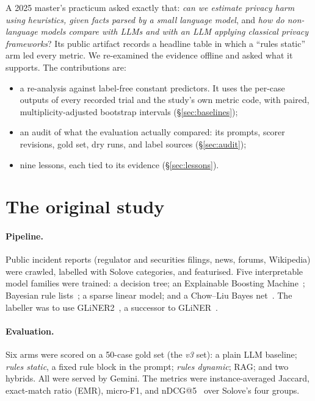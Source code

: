\documentclass[10pt,twocolumn]{article}
\begin{document}
A 2025 master's practicum asked exactly that: \emph{can we estimate privacy harm
using heuristics, given facts parsed by a small language model}, and \emph{how
do non-language models compare with LLMs and with an LLM applying classical
privacy frameworks}? Its public artifact records a headline table in which a
``rules static'' arm led every metric. We re-examined the evidence offline and
asked what it supports. The contributions are:
\begin{itemize}
  \item a re-analysis against label-free constant predictors. It uses the
        per-case outputs of every recorded trial and the study's own metric
        code, with paired, multiplicity-adjusted bootstrap intervals
        (\S\ref{sec:baselines});
  \item an audit of what the evaluation actually compared: its prompts, scorer
        revisions, gold set, dry runs, and label sources (\S\ref{sec:audit});
  \item nine lessons, each tied to its evidence (\S\ref{sec:lessons}).
\end{itemize}

\section{The original study}
\label{sec:study}

\paragraph{Pipeline.} Public incident reports (regulator and securities
filings, news, forums, Wikipedia) were crawled, labelled with Solove categories,
and featurised. Five interpretable model families were trained: a decision
tree; an Explainable Boosting Machine~\cite{lou2012,lou2013,nori2019}; Bayesian
rule lists~\cite{letham2015}; a sparse linear model; and a Chow--Liu Bayes
net~\cite{chow1968}. The labeller was to use GLiNER2~\cite{zaratiana2025}, a
successor to GLiNER~\cite{zaratiana2024}.

\paragraph{Evaluation.} Six arms were scored on a 50-case gold set (the
\emph{v3} set): a plain LLM baseline; \emph{rules static}, a fixed rule block in
the prompt; \emph{rules dynamic}; RAG; and two hybrids. All were served by
Gemini. The metrics were instance-averaged Jaccard, exact-match ratio (EMR),
micro-F1, and nDCG@5~\cite{zhang2014,jarvelin2002} over Solove's four groups.
\end{document}
